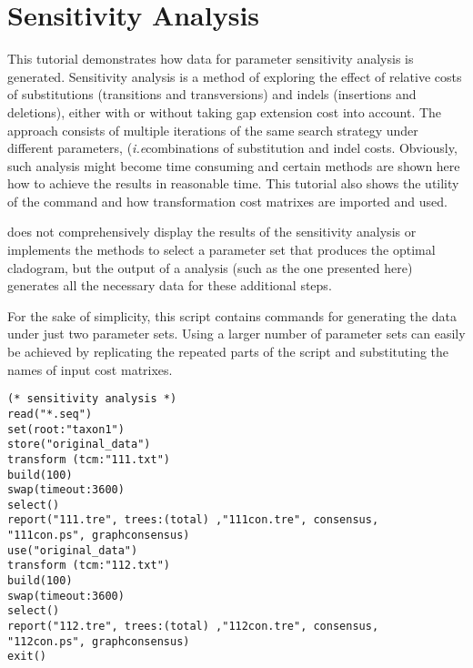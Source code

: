 \section{Sensitivity Analysis}{\label{tutorial 4}}

This tutorial demonstrates how data for parameter sensitivity analysis is generated. Sensitivity analysis \cite{wheeler1995} is a method of exploring the effect of relative costs of substitutions (transitions and transversions) and indels (insertions and deletions), either with or without taking gap extension cost into account. The approach consists of multiple iterations of the same search strategy under different parameters, (\emph{i.e}combinations of substitution and indel costs. Obviously, such analysis might become time consuming and certain methods are shown here how to achieve the results in reasonable time. This tutorial also shows the utility of the command  and how transformation cost matrixes are imported and used.

\poy does not comprehensively display the results of the sensitivity analysis or implements the methods to select a parameter set that produces the optimal cladogram, but the output of a \poy analysis (such as the one presented here) generates all the necessary data for these additional steps.

For the sake of simplicity, this script contains commands for generating the data under just two parameter  sets. Using a larger number of parameter sets can easily be achieved by replicating the repeated parts of the script and substituting the names of input cost matrixes.

\begin{verbatim}
(* sensitivity analysis *)
read("*.seq")
set(root:"taxon1")
store("original_data")
transform (tcm:"111.txt")
build(100)
swap(timeout:3600)
select()
report("111.tre", trees:(total) ,"111con.tre", consensus,
"111con.ps", graphconsensus)
use("original_data")
transform (tcm:"112.txt")
build(100)
swap(timeout:3600)
select()
report("112.tre", trees:(total) ,"112con.tre", consensus,
"112con.ps", graphconsensus)
exit()
\end{verbatim}

